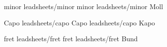  {minor}
 {leadsheets/minor} {minor}
  {leadsheets/minor} {Moll}

 {Capo}
 {leadsheets/capo} {Capo}
  {leadsheets/capo} {Kapo}

 {fret}
 {leadsheets/fret} {fret}
  {leadsheets/fret} {Bund}

\endinput
